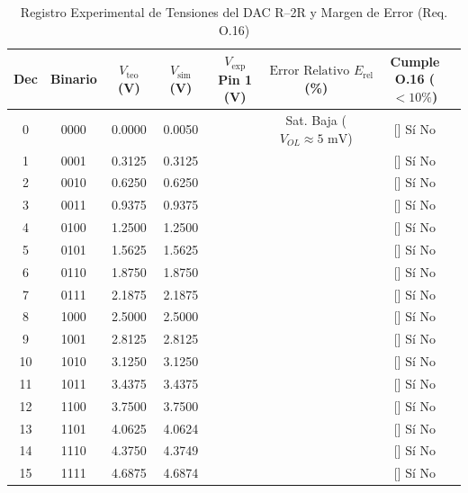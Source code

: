 \documentclass[10pt,a4paper]{article}
\begin{document}
\begin{table}[h!]
\centering
\caption{Registro Experimental de Tensiones del DAC R--2R y Margen de Error (Req. O.16)}
\label{tab:dac_exp}
\footnotesize
\setlength{\tabcolsep}{4.5pt}
\renewcommand{\arraystretch}{1.12}
\begin{tabular}{ccccccc}
\toprule
\textbf{Dec} & \textbf{Binario} & $V_{\text{teo}}$ \textbf{(V)} & $V_{\text{sim}}$ \textbf{(V)} & $V_{\text{exp}}$ \textbf{Pin 1 (V)} & $\text{Error Relativo } E_{\text{rel}}$ \textbf{(\%)} & \textbf{Cumple O.16 ($< 10\%$)} \\
\midrule
0  & 0000 & 0.0000 & 0.0050 & \hspace{1.8cm} & Sat. Baja ($V_{OL} \approx 5\text{ mV}$) & [\quad] Sí \quad [\quad] No \\
1  & 0001 & 0.3125 & 0.3125 &                & & [\quad] Sí \quad [\quad] No \\
2  & 0010 & 0.6250 & 0.6250 &                & & [\quad] Sí \quad [\quad] No \\
3  & 0011 & 0.9375 & 0.9375 &                & & [\quad] Sí \quad [\quad] No \\
4  & 0100 & 1.2500 & 1.2500 &                & & [\quad] Sí \quad [\quad] No \\
5  & 0101 & 1.5625 & 1.5625 &                & & [\quad] Sí \quad [\quad] No \\
6  & 0110 & 1.8750 & 1.8750 &                & & [\quad] Sí \quad [\quad] No \\
7  & 0111 & 2.1875 & 2.1875 &                & & [\quad] Sí \quad [\quad] No \\
8  & 1000 & 2.5000 & 2.5000 &                & & [\quad] Sí \quad [\quad] No \\
9  & 1001 & 2.8125 & 2.8125 &                & & [\quad] Sí \quad [\quad] No \\
10 & 1010 & 3.1250 & 3.1250 &                & & [\quad] Sí \quad [\quad] No \\
11 & 1011 & 3.4375 & 3.4375 &                & & [\quad] Sí \quad [\quad] No \\
12 & 1100 & 3.7500 & 3.7500 &                & & [\quad] Sí \quad [\quad] No \\
13 & 1101 & 4.0625 & 4.0624 &                & & [\quad] Sí \quad [\quad] No \\
14 & 1110 & 4.3750 & 4.3749 &                & & [\quad] Sí \quad [\quad] No \\
15 & 1111 & 4.6875 & 4.6874 &                & & [\quad] Sí \quad [\quad] No \\
\bottomrule
\end{tabular}
\end{table}
\end{document}
